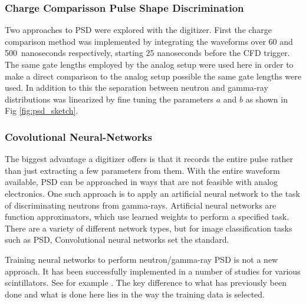 \documentclass[main.tex]{subfiles}
\begin{document}
\subsubsection{Charge Comparisson Pulse Shape Discrimination}
Two approaches to PSD were explored with the digitizer. First the charge comparison method was implemented by integrating the waveforms over 60 and \SI{500}{nanoseconds} respectively, starting 25 nanoseconds before the CFD trigger. The same gate lengths employed by the analog setup were used here in order to make a direct comparison to the analog setup possible the same gate lengths were used. In addition to this the separation between neutron and gamma-ray distributions was linearized by fine tuning the parameters $a$ and $b$ as shown in Fig \ref{fig:psd_sketch}.

\subsubsection{Covolutional Neural-Networks}\label{sec:cnn}
The biggest advantage a digitizer offers is that it records the entire pulse rather than just extracting a few parameters from them. With the entire waveform available, PSD can be approached in ways that are not feasible with analog electronics. One such approach is to apply an artificial neural network to the task of discriminating neutrons from gamma-rays. 
Artificial neural networks are function approximators, which use learned weights to perform a specified task. There are a variety of different network types, but for image classification tasks such as PSD, Convolutional neural networks set the standard. 

Training neural networks to perform neutron/gamma-ray PSD is not a new approach. It has been successfully implemented in a number of studies for various scintillators. See for example \cite{Griffiths}. The key difference to what has previously been done and what is done here lies in the way the training data is selected.
\end{document}
